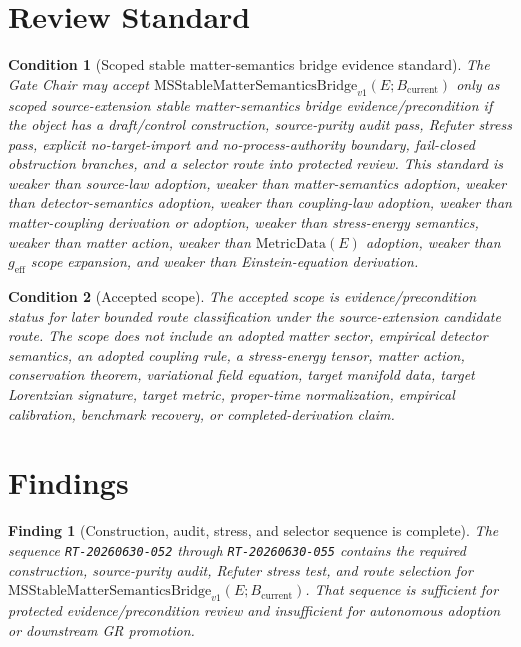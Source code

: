 \documentclass[11pt]{article}
\newcommand{\Bcur}{B_{\mathrm{current}}}
\newcommand{\MSBridge}{\mathrm{MSStableMatterSemanticsBridge}_{v1}}
\newcommand{\MetricData}{\mathrm{MetricData}}
\newcommand{\geff}{g_{\mathrm{eff}}}
\newtheorem{finding}{Finding}
\newtheorem{condition}{Condition}
\begin{document}
\section{Review Standard}

\begin{condition}[Scoped stable matter-semantics bridge evidence standard]
The Gate Chair may accept \(\MSBridge(E;\Bcur)\) only as scoped
source-extension stable matter-semantics bridge evidence/precondition if the
object has a draft/control construction, source-purity audit pass, Refuter
stress pass, explicit no-target-import and no-process-authority boundary,
fail-closed obstruction branches, and a selector route into protected review.
This standard is weaker than source-law adoption, weaker than matter-semantics
adoption, weaker than detector-semantics adoption, weaker than coupling-law
adoption, weaker than matter-coupling derivation or adoption, weaker than
stress-energy semantics, weaker than matter action, weaker than
\(\MetricData(E)\) adoption, weaker than \(\geff\) scope expansion, and
weaker than Einstein-equation derivation.
\end{condition}

\begin{condition}[Accepted scope]
The accepted scope is evidence/precondition status for later bounded route
classification under the source-extension candidate route. The scope does not
include an adopted matter sector, empirical detector semantics, an adopted
coupling rule, a stress-energy tensor, matter action, conservation theorem,
variational field equation, target manifold data, target Lorentzian
signature, target metric, proper-time normalization, empirical calibration,
benchmark recovery, or completed-derivation claim.
\end{condition}

\section{Findings}

\begin{finding}[Construction, audit, stress, and selector sequence is complete]
The sequence \texttt{RT-20260630-052} through \texttt{RT-20260630-055}
contains the required construction, source-purity audit, Refuter stress test,
and route selection for \(\MSBridge(E;\Bcur)\). That sequence is sufficient
for protected evidence/precondition review and insufficient for autonomous
adoption or downstream GR promotion.
\end{finding}
\end{document}
